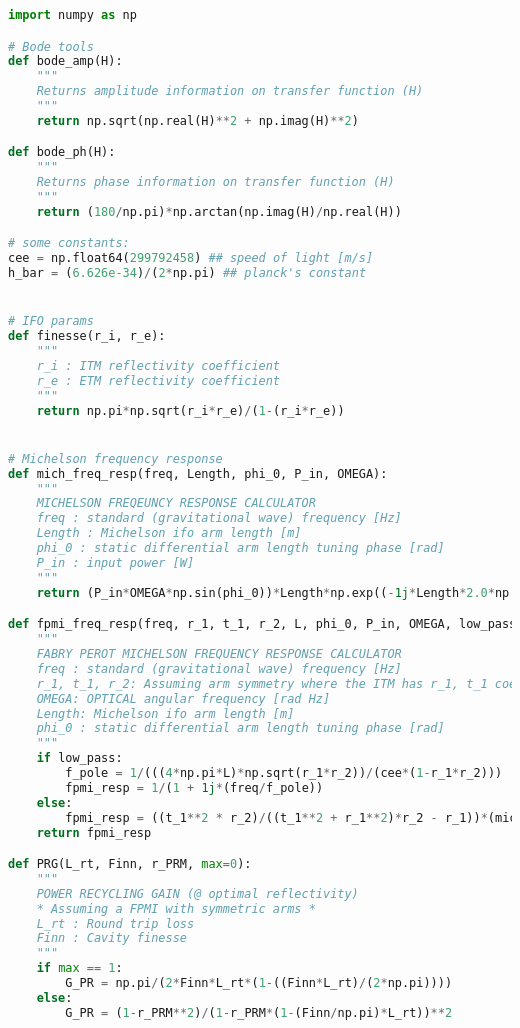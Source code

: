 \begin{lstlisting}[frame=single, language=Python]
import numpy as np

# Bode tools 
def bode_amp(H):
    """
    Returns amplitude information on transfer function (H)
    """
    return np.sqrt(np.real(H)**2 + np.imag(H)**2)

def bode_ph(H):
    """
    Returns phase information on transfer function (H)
    """
    return (180/np.pi)*np.arctan(np.imag(H)/np.real(H))

# some constants:
cee = np.float64(299792458) ## speed of light [m/s]
h_bar = (6.626e-34)/(2*np.pi) ## planck's constant


# IFO params
def finesse(r_i, r_e):
    """
    r_i : ITM reflectivity coefficient
    r_e : ETM reflectivity coefficient
    """
    return np.pi*np.sqrt(r_i*r_e)/(1-(r_i*r_e))


# Michelson frequency response
def mich_freq_resp(freq, Length, phi_0, P_in, OMEGA):
    """ 
    MICHELSON FREQEUNCY RESPONSE CALCULATOR
    freq : standard (gravitational wave) frequency [Hz]
    Length : Michelson ifo arm length [m]
    phi_0 : static differential arm length tuning phase [rad]
    P_in : input power [W] 
    """
    return (P_in*OMEGA*np.sin(phi_0))*Length*np.exp((-1j*Length*2.0*np.pi*freq)/cee)*np.sin((Length*2.0*np.pi*freq)/cee)/(Length*2.0*np.pi*freq)

def fpmi_freq_resp(freq, r_1, t_1, r_2, L, phi_0, P_in, OMEGA, low_pass=False):
    """
    FABRY PEROT MICHELSON FREQUENCY RESPONSE CALCULATOR
    freq : standard (gravitational wave) frequency [Hz]
    r_1, t_1, r_2: Assuming arm symmetry where the ITM has r_1, t_1 coefficients and the ETM has a r_2 reflectivity coefficient. Also assumes no loss. [arb]
    OMEGA: OPTICAL angular frequency [rad Hz]
    Length: Michelson ifo arm length [m]
    phi_0 : static differential arm length tuning phase [rad]
    """
    if low_pass:
        f_pole = 1/(((4*np.pi*L)*np.sqrt(r_1*r_2))/(cee*(1-r_1*r_2)))
        fpmi_resp = 1/(1 + 1j*(freq/f_pole))
    else:
        fpmi_resp = ((t_1**2 * r_2)/((t_1**2 + r_1**2)*r_2 - r_1))*(mich_freq_resp(freq, L, phi_0, P_in, OMEGA)/(1-r_1*r_2*np.exp(-1j*L*4.0*np.pi*freq/cee)))
    return fpmi_resp

def PRG(L_rt, Finn, r_PRM, max=0):
    """
    POWER RECYCLING GAIN (@ optimal reflectivity)
    * Assuming a FPMI with symmetric arms *
    L_rt : Round trip loss
    Finn : Cavity finesse
    """
    if max == 1:
        G_PR = np.pi/(2*Finn*L_rt*(1-((Finn*L_rt)/(2*np.pi))))
    else:
        G_PR = (1-r_PRM**2)/(1-r_PRM*(1-(Finn/np.pi)*L_rt))**2



\end{lstlisting}
